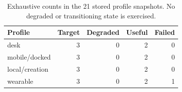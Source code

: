 \begin{table}[t]
\centering
\caption{Exhaustive counts in the 21 stored profile snapshots. No degraded or transitioning state is exercised.}
\label{tab:fixture}
\par\smallskip
\small
\begin{tabular}{lrrrr}
\toprule
Profile & Target & Degraded & Useful & Failed \\
\midrule
desk & 3 & 0 & 2 & 0 \\
mobile/docked & 3 & 0 & 2 & 0 \\
local/creation & 3 & 0 & 2 & 0 \\
wearable & 3 & 0 & 2 & 1 \\
\bottomrule
\end{tabular}
\end{table}
